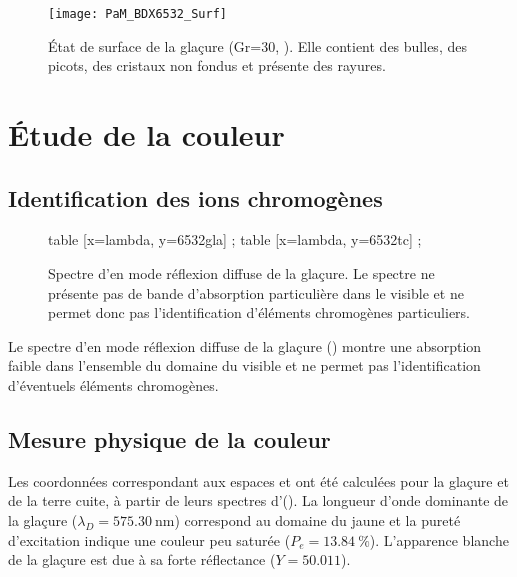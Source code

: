 \begin{figure}[htb]
  \texttt{[image: PaM\_BDX6532\_Surf]}
  \caption{\legendeE 
           État de surface de la glaçure (Gr=30, ). Elle contient des bulles, des 
           picots, des cristaux non fondus et présente des rayures.}
  \label{surf:6532}
\end{figure}


\section{Étude de la couleur}

\subsection{Identification des ions chromogènes}
\begin{figure}[htb]
  \begin{plotspectre}
       table [x=lambda, y=6532gla] {\gladata} ;
       table [x=lambda, y=6532tc] {\tcdata} ;
  \end{plotspectre}
  \caption{\legendeE 
           Spectre d'\AO en mode réflexion diffuse de la glaçure. Le spectre ne présente pas de bande d'absorption particulière dans le visible et ne permet donc pas l'identification d'éléments chromogènes particuliers.}
  \label{spectre:6532}
\end{figure}

Le spectre d'\AO en mode réflexion diffuse de la glaçure () montre une absorption faible dans l'ensemble du domaine du visible et ne permet pas l'identification d'éventuels éléments chromogènes.

\subsection{Mesure physique de la couleur}
Les coordonnées \trichros correspondant aux espaces \Yxy et \Lab ont été calculées pour la glaçure et de la terre cuite, à partir de leurs spectres d'\AO (). La longueur d'onde dominante de la glaçure ($\lambda_D=\SI{575.30}{\nm}$) correspond au domaine du jaune \autocite{Kelly_1976} et la pureté d'excitation indique une couleur peu saturée ($P_e=\SI{13.84}{\percent}$). L'apparence blanche de la glaçure est due à sa forte réflectance ($Y=\num{50.011}$).

